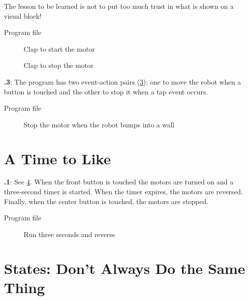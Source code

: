\documentclass[12pt,a4paper,english]{article}
\begin{document}
The lesson to be learned is not to put
too much trust in what is shown on a visual block!

{\raggedleft \hfill Program file }

\begin{figure}
\begin{center}
\caption{Clap to start the motor}\label{fig.clap-to-start}
\end{center}
\end{figure}

\begin{figure}[hbt]
\begin{center}
\caption{Clap to stop the motor}\label{fig.clap-to-stop}
\end{center}
\end{figure}

\textbf{\thesection.3}:
The program has two event-action pairs (\cref{fig.bump}): one to
move the robot when a button is touched and the other to stop it when a
tap event occurs.

{\raggedleft \hfill Program file }

\begin{figure}[hbt]
\begin{center}
\caption{Stop the motor when the robot bumps into a wall}\label{fig.bump}
\end{center}
\end{figure}


\section{A Time to Like}

\textbf{\thesection.1}:
See \cref{fig.three}. When the front button
is touched the motors are turned on and a three-second timer is started.
When the timer expires, the motors are reversed. Finally, when the
center button is touched, the motors are stopped.

{\raggedleft \hfill Program file }


\begin{figure}[hbt]
\begin{center}
\caption{Run three seconds and reverse}\label{fig.three}
\end{center}
\end{figure}


\section{States: Don't Always Do the Same Thing}
\end{document}
